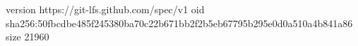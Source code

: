 version https://git-lfs.github.com/spec/v1
oid sha256:50fbcdbe485f245380ba70c22b671bb2f2b5eb67795b295e0d0a510a4b841a86
size 21960

